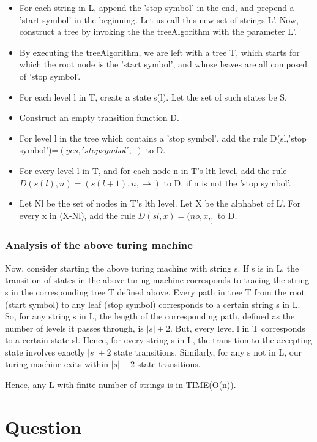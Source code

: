 \documentclass[10pt]{article}
\begin{document}
\begin{itemize}
\item For each string in L, append the 'stop symbol' in the end, and prepend a 'start symbol' in the beginning. Let us call this new set of strings L'. Now, construct a tree by invoking the the treeAlgorithm with the parameter L'.
\item By executing the treeAlgorithm, we are left with a tree T, which starts for which the root node is the 'start symbol', and whose leaves are all composed of 'stop symbol'.
\item For each level l in T, create a state s(l). Let the set of such states be S.
\item Construct an empty transition function D.
\item For level l in the tree which contains a 'stop symbol', add the rule D(sl,'stop symbol')=$(yes,'stop symbol',\_)$ to D.
\item For every level l in T, and for each node n in T's lth level, add the rule $D(s(l),n)=(s(l+1),n,\rightarrow)$ to D, if n is not the 'stop symbol'.
\item Let Nl be the set of nodes in T's lth level. Let X be the alphabet of L'. For every x in (X-Nl), add the rule $D(sl,x)=(no,x,_)$ to D.
\end{itemize}

\subsubsection*{Analysis of the above turing machine}

Now, consider starting the above turing machine with string s. If s is in L, the transition of states in the above turing machine corresponds to tracing the string s in the corresponding tree T defined above. Every path in tree T from the root (start symbol) to any leaf (stop symbol) corresponds to a certain string s in L. So, for any string s in L, the length of the corresponding path, defined as the number of levels it passes through, is $|s|+2$. But, every level l in T corresponds to a certain state sl. Hence, for every string s in L, the transition to the accepting state involves exactly $|s|+2$ state transitions. Similarly, for any s not in L, our turing machine exits within $|s|+2$ state transitions.

Hence, any L with finite number of strings is in TIME(O(n)).

\section{Question}
\end{document}
